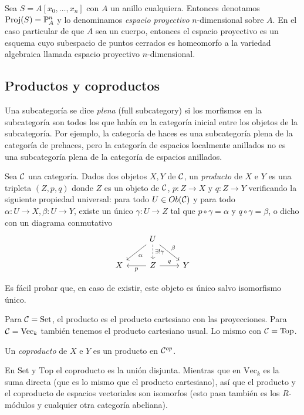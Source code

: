 \documentclass[GA.tex]{subfiles}
\begin{document}
\begin{ej}
Sea $S=A[x_0,\dots, x_n]$ con $A$ un anillo cualquiera. Entonces denotamos $\operatorname{Proj}(S)=\mathbb{P}^n_A$ y lo denominamos \emph{espacio proyectivo} $n$-dimensional sobre $A$. En el caso particular de que $A$ sea un cuerpo, entonces el espacio proyectivo es un esquema cuyo subespacio de puntos cerrados es homeomorfo a la variedad algebraica llamada espacio proyectivo $n$-dimensional. 
\end{ej}

\subsection{Productos y coproductos}

\begin{nota}
Una subcategoría se dice \emph{plena} (full subcategory) si los morfismos en la subcategoría son todos los que había en la categoría inicial entre los objetos de la subcategoría. Por ejemplo, la categoría de haces es una subcategoría plena de la categoría de prehaces, pero la categoría de espacios localmente anillados no es una subcategoría plena de la categoría de espacios anillados.
\end{nota}

\begin{defi}
Sea $\mathcal{C}$ una categoría. Dados dos objetos $X,Y$ de $\mathcal{C}$, un \emph{producto} de $X$ e $Y$ es una tripleta $(Z,p,q)$ donde $Z$ es un objeto de $\mathcal{C}$, $p:Z\to X$ y $q:Z\to Y$ verificando la siguiente propiedad universal: para todo $U\in Ob(\mathcal{C})$ y para todo $\alpha:U\to X, \beta:U\to Y$, existe un único $\gamma:U\to Z$ tal que $p\circ\gamma=\alpha$ y $q\circ\gamma=\beta$, o dicho con un diagrama conmutativo
\[
\begin{tikzcd}
& U\arrow[dl, "\alpha"]\arrow[dr, "\beta"]\arrow[d, dashed, "\exists!\gamma"] & \\
X & Z\arrow[r, "q"]\arrow[l, "p"] & Y
\end{tikzcd}
\]
\end{defi}
Es fácil probar que, en caso de existir, este objeto es único salvo isomorfismo único.
\begin{ej}
Para $\mathcal{C}=\mathrm{Set}$, el producto es el producto cartesiano con las proyecciones. Para $\mathcal{C}=\mathrm{Vec}_k$ también tenemos el producto cartesiano usual. Lo mismo con $\mathcal{C}=\mathrm{Top}$. 
\end{ej}

\begin{defi}
Un \emph{coproducto} de $X$ e $Y$ es un producto en $\mathcal{C}^{op}$. 
\end{defi}
\begin{defi}
En $\mathrm{Set}$ y $\mathrm{Top}$ el coproducto es la unión disjunta. Mientras que en $\mathrm{Vec}_k$ es la suma directa (que es lo mismo que el producto cartesiano), así que el producto y el coproducto de espacios vectoriales son isomorfos (esto pasa también es los $R$-módulos y cualquier otra categoría abeliana). 
\end{defi}
\end{document}
